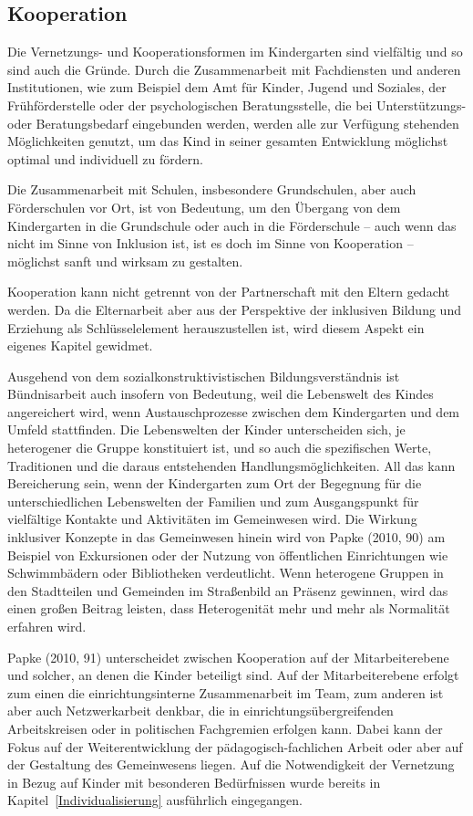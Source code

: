 \subsection{Kooperation}
\label{Kooperation}
Die Vernetzungs- und Kooperationsformen im Kindergarten sind vielfältig und so sind auch die Gründe. 
Durch die Zusammenarbeit mit Fachdiensten und anderen Institutionen, wie zum Beispiel dem Amt für Kinder, Jugend und Soziales, der Frühförderstelle oder der psychologischen Beratungsstelle, die bei Unterstützungs- oder Beratungsbedarf eingebunden werden, werden alle zur Verfügung stehenden Möglichkeiten genutzt, um das Kind in seiner gesamten Entwicklung möglichst optimal und individuell zu fördern.

Die Zusammenarbeit mit Schulen, insbesondere Grundschulen, aber auch Förderschulen vor Ort, ist von Bedeutung, um den Übergang von dem Kindergarten in die Grundschule oder auch in die Förderschule -- auch wenn das nicht im Sinne von Inklusion ist, ist es doch im Sinne von Kooperation -- möglichst sanft und wirksam zu gestalten. 

Kooperation kann nicht getrennt von der Partnerschaft mit den Eltern gedacht werden. Da die Elternarbeit aber aus der Perspektive der inklusiven Bildung und Erziehung als Schlüsselelement herauszustellen ist, wird diesem Aspekt ein eigenes Kapitel gewidmet. 

Ausgehend von dem sozialkonstruktivistischen Bildungsverständnis ist Bündnisarbeit auch insofern von Bedeutung, weil die Lebenswelt des Kindes angereichert wird, wenn Austauschprozesse zwischen dem Kindergarten und dem Umfeld stattfinden. Die Lebenswelten der Kinder unterscheiden sich, je heterogener die Gruppe konstituiert ist, und so auch die spezifischen Werte, Traditionen und die daraus entstehenden Handlungsmöglichkeiten. All das kann Bereicherung sein, wenn der Kindergarten zum Ort der Begegnung für die unterschiedlichen Lebenswelten der Familien und zum Ausgangspunkt für vielfältige Kontakte und Aktivitäten im Gemeinwesen wird.  
Die Wirkung inklusiver Konzepte in das Gemeinwesen hinein wird von Papke (2010, 90) am Beispiel von Exkursionen oder der Nutzung von öffentlichen Einrichtungen wie Schwimmbädern oder Bibliotheken verdeutlicht. Wenn heterogene Gruppen in den Stadtteilen und Gemeinden im Straßenbild an Präsenz gewinnen, wird das einen großen Beitrag leisten, dass Heterogenität mehr und mehr als Normalität erfahren wird.   
 
Papke (2010, 91) unterscheidet zwischen Kooperation auf der Mitarbeiterebene und solcher, an denen die Kinder beteiligt sind. Auf der Mitarbeiterebene erfolgt zum einen die einrichtungsinterne Zusammenarbeit im Team, zum anderen ist aber auch Netzwerkarbeit denkbar, die in einrichtungsübergreifenden Arbeitskreisen oder in politischen Fachgremien erfolgen kann. Dabei kann der Fokus auf der Weiterentwicklung der pädagogisch-fachlichen Arbeit oder aber auf der Gestaltung des Gemeinwesens liegen.
Auf die Notwendigkeit der Vernetzung in Bezug auf Kinder mit besonderen Bedürfnissen wurde bereits in Kapitel~\ref{Individualisierung} ausführlich eingegangen.     

